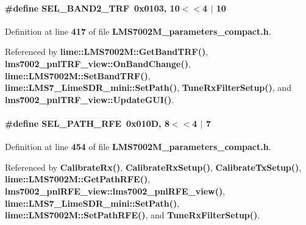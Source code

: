 \paragraph[{S\+E\+L\+\_\+\+B\+A\+N\+D2\+\_\+\+T\+RF}]{\setlength{\rightskip}{0pt plus 5cm}\#define S\+E\+L\+\_\+\+B\+A\+N\+D2\+\_\+\+T\+RF~0x0103, 10$<$$<$4 $\vert$  10}\label{LMS7002M__parameters__compact_8h_ac07f7f2803609c5bbdf20b845ec41ecd}


Definition at line {\bf 417} of file {\bf L\+M\+S7002\+M\+\_\+parameters\+\_\+compact.\+h}.



Referenced by {\bf lime\+::\+L\+M\+S7002\+M\+::\+Get\+Band\+T\+R\+F()}, {\bf lms7002\+\_\+pnl\+T\+R\+F\+\_\+view\+::\+On\+Band\+Change()}, {\bf lime\+::\+L\+M\+S7002\+M\+::\+Set\+Band\+T\+R\+F()}, {\bf lime\+::\+L\+M\+S7\+\_\+\+Lime\+S\+D\+R\+\_\+mini\+::\+Set\+Path()}, {\bf Tune\+Rx\+Filter\+Setup()}, and {\bf lms7002\+\_\+pnl\+T\+R\+F\+\_\+view\+::\+Update\+G\+U\+I()}.

\paragraph[{S\+E\+L\+\_\+\+P\+A\+T\+H\+\_\+\+R\+FE}]{\setlength{\rightskip}{0pt plus 5cm}\#define S\+E\+L\+\_\+\+P\+A\+T\+H\+\_\+\+R\+FE~0x010\+D, 8$<$$<$4 $\vert$  7}\label{LMS7002M__parameters__compact_8h_a4bb758bae02e8ff3110fadfb3f0eafb7}


Definition at line {\bf 454} of file {\bf L\+M\+S7002\+M\+\_\+parameters\+\_\+compact.\+h}.



Referenced by {\bf Calibrate\+Rx()}, {\bf Calibrate\+Rx\+Setup()}, {\bf Calibrate\+Tx\+Setup()}, {\bf lime\+::\+L\+M\+S7002\+M\+::\+Get\+Path\+R\+F\+E()}, {\bf lms7002\+\_\+pnl\+R\+F\+E\+\_\+view\+::lms7002\+\_\+pnl\+R\+F\+E\+\_\+view()}, {\bf lime\+::\+L\+M\+S7\+\_\+\+Lime\+S\+D\+R\+\_\+mini\+::\+Set\+Path()}, {\bf lime\+::\+L\+M\+S7002\+M\+::\+Set\+Path\+R\+F\+E()}, and {\bf Tune\+Rx\+Filter\+Setup()}.

